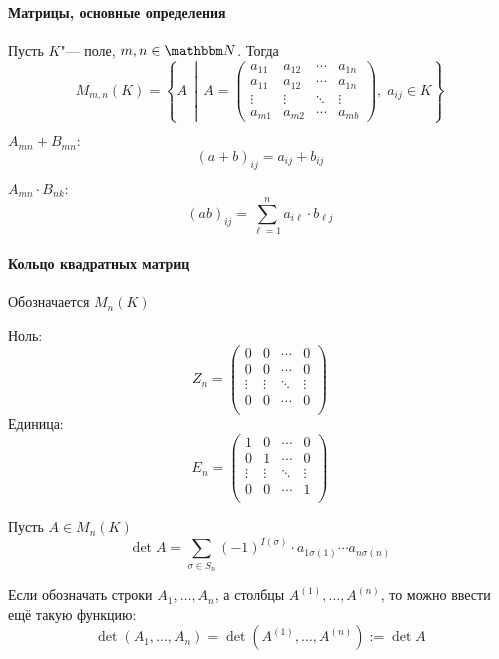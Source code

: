 \documentclass[12pt]{../../../notes}
\begin{document}
\paragraph{Матрицы, основные определения}
\begin{defn}\label{defn:matrices}
  Пусть $K$"--- поле, $m,n\in \N$. Тогда
  \[
    M_{m,n}(K) = 
    \left\{
      A 
    \,\middle|\,
      A  = 
      \begin{pmatrix}
        a_{11} & a_{12} & \cdots & a_{1n} \\
        a_{11} & a_{12} & \cdots & a_{1n} \\
        \vdots & \vdots & \ddots & \vdots \\
        a_{m1} & a_{m2} & \cdots & a_{mb}
      \end{pmatrix},\;
      a_{ij} \in K
    \right\}
  \]
\end{defn}

\begin{defn}\label{defn:matradd}
  $A_{mn} + B_{mn}:$
  \[
    (a+b)_{ij} = a_{ij} + b_{ij}
  \]
\end{defn}

\begin{defn}\label{defn:matrmul}
  $A_{mn}\cdot B_{nk}:$
  \[
    (ab)_{ij} = \sum_{\ell=1}^n a_{i\ell}\cdot b_{\ell j}
  \]
\end{defn}

\paragraph{Кольцо квадратных матриц}
Обозначается $M_n(K)$

\noindent Ноль:
\[
  Z_n = 
  \begin{pmatrix}
    0      & 0      & \cdots & 0 \\
    0      & 0      & \cdots & 0 \\
    \vdots & \vdots & \ddots & \vdots \\
    0      & 0      & \cdots & 0 \\
  \end{pmatrix}
\]
Единица:
\[
  E_n = 
  \begin{pmatrix}
    1      & 0      & \cdots & 0 \\
    0      & 1      & \cdots & 0 \\
    \vdots & \vdots & \ddots & \vdots \\
    0      & 0      & \cdots & 1 \\
  \end{pmatrix}
\]
\begin{defn}\label{defn:determinant}
  Пусть $A\in M_n(K)$
  \[
    \det A = \sum_{\sigma \in S_n} (-1)^{I(\sigma)} \cdot a_{1\sigma(1)} \dotsm a_{n\sigma(n)}
  \]
\end{defn}
\begin{defn}\label{defn:determrows}
  Если обозначать строки $A_1, \dotsc , A_n$, а столбцы $A^{(1)}, \dotsc , A^{(n)}$,
  то можно ввести ещё такую функцию:
  \[
    \det (A_1, \dotsc , A_n) = \det (A^{(1)}, \dotsc , A^{(n)}) := \det A
  \]
\end{defn}
\end{document}
